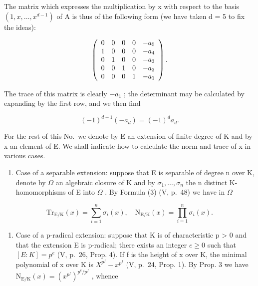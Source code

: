 The matrix which expresses the multiplication by x with respect to the basis \((1, x, \ldots, x^{d-1})\) of A is thus of the following form (we have taken d = 5 to fix the ideas):

\[
\left( \begin{array}{c c c c c} 0 & 0 & 0 & 0 & - a _ {5} \\ 1 & 0 & 0 & 0 & - a _ {4} \\ 0 & 1 & 0 & 0 & - a _ {3} \\ 0 & 0 & 1 & 0 & - a _ {2} \\ 0 & 0 & 0 & 1 & - a _ {1} \end{array} \right).
\]

The trace of this matrix is clearly \(-a_{1}\) ; the determinant may be calculated by expanding by the first row, and we then find

\[
(- 1) ^ {d - 1} (- a _ {d}) = (- 1) ^ {d} a _ {d}.
\]

For the rest of this No.~we denote by E an extension of finite degree of K and by x an element of E. We shall indicate how to calculate the norm and trace of x in various cases.

\begin{enumerate}
\def\labelenumi{\alph{enumi})}
\tightlist
\item
  Case of a separable extension: suppose that E is separable of degree n over K, denote by \(\Omega\) an algebraic closure of K and by \(\sigma_{1}, \ldots, \sigma_{n}\) the n distinct K-homomorphisms of E into \(\Omega\) . By Formula (3) (V, p.~48) we have in \(\Omega\)
\end{enumerate}

\[
\mathrm{Tr} _ {\mathrm{E} / \mathrm{K}} (x) = \sum_ {i = 1} ^ {n} \sigma_ {i} (x), \quad \mathrm{N} _ {\mathrm{E} / \mathrm{K}} (x) = \prod_ {i = 1} ^ {n} \sigma_ {i} (x).\tag{12}
\]

\begin{enumerate}
\def\labelenumi{\alph{enumi})}
\setcounter{enumi}{1}
\tightlist
\item
  Case of a p-radical extension: suppose that K is of characteristic p \textgreater{} 0 and that the extension E is p-radical; there exists an integer \(e \geqslant 0\) such that \([E : K] = p^{e}\) (V, p.~26, Prop. 4). If f is the height of x over K, the minimal polynomial of x over K is \(X^{p^{f}} - x^{p^{f}}\) (V, p.~24, Prop. 1). By Prop. 3 we have \(\mathrm{N}_{\mathrm{E}/\mathrm{K}}(x) = (x^{p^{f}})^{p^{e}/p^{f}}\) , whence
\end{enumerate}

